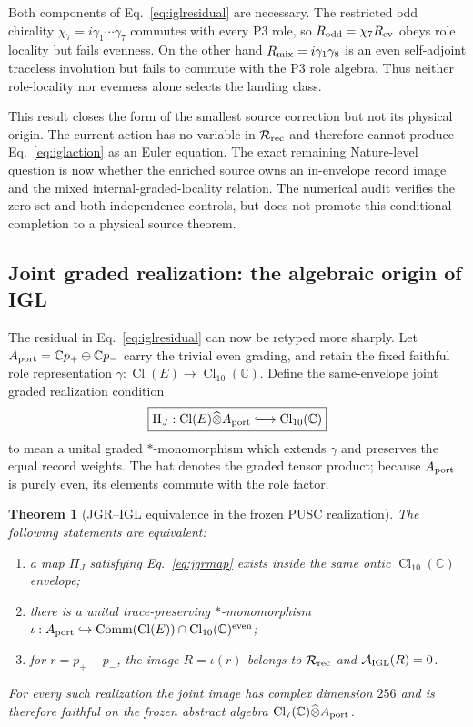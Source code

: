 \documentclass[11pt,a4paper]{article}
\newtheorem{theorem}[definition]{Theorem}
\theoremstyle{remark}
\begin{document}
Both components of Eq.~\eqref{eq:iglresidual} are necessary.  The restricted
odd chirality $\chi_7=i\gamma_1\cdots\gamma_7$ commutes with every P3 role, so
$R_{\rm odd}=\chi_7 R_{\rm ev}$ obeys role locality but fails evenness.  On the
other hand $R_{\rm mix}=i\gamma_1\gamma_8$ is an even self-adjoint traceless
involution but fails to commute with the P3 role algebra.  Thus neither
role-locality nor evenness alone selects the landing class.

This result closes the form of the smallest source correction but not its
physical origin.  The current action has no variable in
$\mathcal R_{\rm rec}$ and therefore cannot produce
Eq.~\eqref{eq:iglaction} as an Euler equation.  The exact remaining
Nature-level question is now whether the enriched source owns an in-envelope
record image and the mixed internal-graded-locality relation.  The numerical
audit verifies the zero set and both independence controls, but does not
promote this conditional completion to a physical source theorem.

\subsection{Joint graded realization: the algebraic origin of IGL}

The residual in Eq.~\eqref{eq:iglresidual} can now be retyped more sharply.
Let $A_{\rm port}=\mathbb C p_+\oplus\mathbb C p_-$ carry the trivial even
grading, and retain the fixed faithful role representation
$\gamma:\operatorname{Cl}(E)\to\operatorname{Cl}_{10}(\mathbb C)$.  Define
the same-envelope joint graded realization condition
\begin{equation}
 \boxed{
 \Pi_J:\operatorname{Cl}(E)\widehat\otimes A_{\rm port}
 \lhook\joinrel\longrightarrow \operatorname{Cl}_{10}(\mathbb C)}
 \label{eq:jgrmap}
\end{equation}
to mean a unital graded $*$-monomorphism which extends $\gamma$ and preserves
the equal record weights.  The hat denotes the graded tensor product; because
$A_{\rm port}$ is purely even, its elements commute with the role factor.

\begin{theorem}[JGR--IGL equivalence in the frozen PUSC realization]
The following statements are equivalent:
\begin{enumerate}
 \item a map $\Pi_J$ satisfying Eq.~\eqref{eq:jgrmap} exists inside the same
 ontic $\operatorname{Cl}_{10}(\mathbb C)$ envelope;
 \item there is a unital trace-preserving $*$-monomorphism
 $\iota:A_{\rm port}\hookrightarrow
 \operatorname{Comm}(\operatorname{Cl}(E))\cap
 \operatorname{Cl}_{10}(\mathbb C)^{\rm even}$;
 \item for $r=p_+-p_-$, the image $R=\iota(r)$ belongs to
 $\mathcal R_{\rm rec}$ and $\mathcal A_{\rm IGL}(R)=0$.
\end{enumerate}
For every such realization the joint image has complex dimension $256$ and
is therefore faithful on the frozen abstract algebra
$\operatorname{Cl}_7(\mathbb C)\widehat\otimes A_{\rm port}$.
\label{thm:jgrigl}
\end{theorem}
\end{document}
